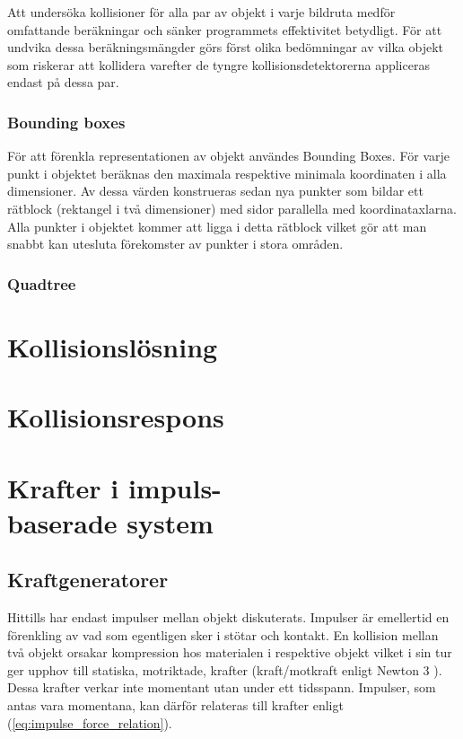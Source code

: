 \documentclass[a4paper,12pt,twocolumn,swedish]{article}
\begin{document}
Att undersöka kollisioner för alla par av objekt i varje bildruta medför omfattande beräkningar och sänker programmets effektivitet betydligt. För att undvika dessa beräkningsmängder görs först olika bedömningar av vilka objekt som riskerar att kollidera varefter de tyngre kollisionsdetektorerna appliceras endast på dessa par.

\subsubsection{Bounding boxes}

För att förenkla representationen av objekt användes Bounding Boxes. För varje punkt i objektet beräknas den maximala respektive minimala koordinaten i alla dimensioner. Av dessa värden konstrueras sedan nya punkter som bildar ett rätblock (rektangel i två dimensioner) med sidor parallella med koordinataxlarna. Alla punkter i objektet kommer att ligga i detta rätblock vilket gör att man snabbt kan utesluta förekomster av punkter i stora områden.

\subsubsection{Quadtree}


\section{Kollisionslösning}
\section{Kollisionsrespons}
\section{Krafter i impuls-\\baserade system}

\subsection{Kraftgeneratorer}

Hittills har endast impulser mellan objekt diskuterats. Impulser är emellertid en förenkling av vad som egentligen sker i stötar och kontakt. En kollision mellan två objekt orsakar kompression hos materialen i respektive objekt vilket i sin tur ger upphov till statiska, motriktade, krafter (kraft/motkraft enligt Newton 3 \cite{newton87}). Dessa krafter verkar inte momentant utan under ett tidsspann. Impulser, som antas vara momentana, kan därför relateras till krafter enligt  (\ref{eq:impulse_force_relation}).
\end{document}
